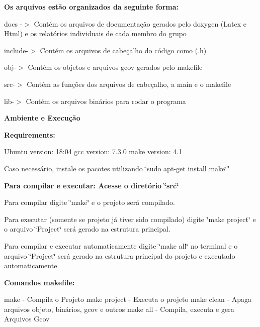 {\bfseries Os arquivos estão organizados da seguinte forma\+:}


\begin{DoxyItemize}
\item docs -\/$>$ Contém os arquivos de documentação gerados pelo doxygen (Latex e Html) e os relatórios individuais de cada membro do grupo
\item include-\/$>$ Contém os arquivos de cabeçalho do código como (.h)
\item obj-\/$>$ Contém os objetos e arquivos gcov gerados pelo makefile
\item src-\/$>$ Contém as funções dos arquivos de cabeçalho, a main e o makefile
\item lib-\/$>$ Contém os arquivos binários para rodar o programa 


\end{DoxyItemize}

{\bfseries Ambiente e Execução}

{\bfseries Requirements\+:} \begin{DoxyVerb}Ubuntu version: 18:04
gcc version: 7.3.0
make version: 4.1
\end{DoxyVerb}

\begin{DoxyItemize}
\item Caso necessário, instale os pacotes utilizando \char`\"{}sudo apt-\/get install make\char`\"{}"
\end{DoxyItemize}

{\bfseries Para compilar e executar\+: Acesse o diretório \char`\"{}src\char`\"{}}


\begin{DoxyItemize}
\item Para compilar digite \char`\"{}make\char`\"{} e o projeto será compilado.
\item Para executar (somente se projeto já tiver sido compilado) digite \char`\"{}make project\char`\"{} e o arquivo \char`\"{}\+Project\char`\"{} será gerado na estrutura principal.
\item Para compilar e executar automaticamente digite \char`\"{}make all\char`\"{} no terminal e o arquivo \char`\"{}\+Project\char`\"{} será gerado na estrutura principal do projeto e executado automaticamente
\end{DoxyItemize}

{\bfseries Comandos makefile\+:} \begin{DoxyVerb}make         -  Compila o Projeto
make project     -  Executa o projeto
make clean   -  Apaga arquivos objeto, binários, gcov e outros
make all     -  Compila, executa e gera Arquivos Gcov
\end{DoxyVerb}






